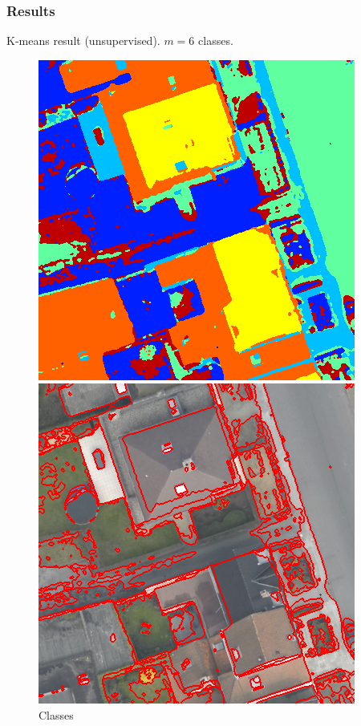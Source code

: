 \documentclass{beamer}
\begin{document}

\begin{frame}
  \frametitle{Results}
  K-means result (unsupervised). $m = 6$ classes.
  \begin{figure}[ht]
    \begin{minipage}[b]{0.45\linewidth}
      \centering
      \includegraphics[width=\textwidth]{./Images/DFC2015/K.png}
      \caption{Classes}
    \end{minipage}
    \begin{minipage}[b]{0.45\linewidth}
      \centering
      \includegraphics[width=\textwidth]{./Images/DFC2015/segmentation.png}

\end{minipage}
\end{figure}
\end{frame}
\end{document}
